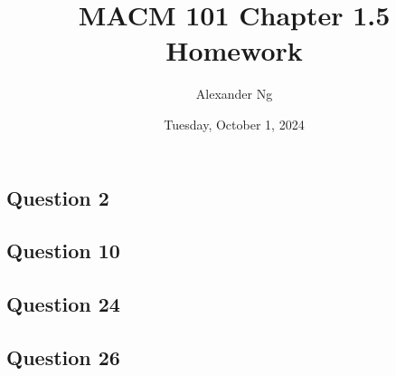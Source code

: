 \documentclass[12pt]{article}
\begin{document}
\title{MACM 101 Chapter 1.5 Homework}
\author{Alexander Ng}
\date{Tuesday, October 1, 2024}

\maketitle

\subsection*{Question 2}
\subsection*{Question 10}
\subsection*{Question 24}
\subsection*{Question 26}
\end{document}
